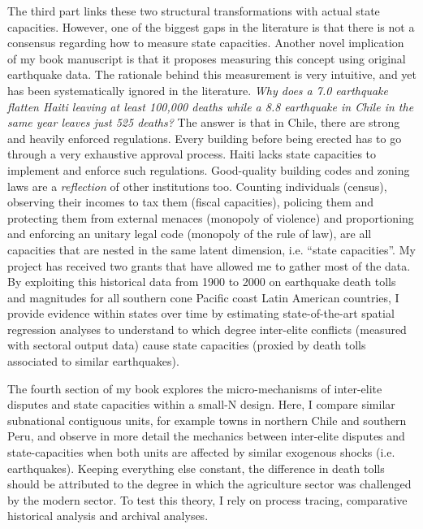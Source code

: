 \documentclass[11pt]{letter} %
\begin{document}
\begin{letter}{}
The third part links these two structural transformations with actual state capacities. However, one of the biggest gaps in the literature is that there is not a consensus regarding how to measure state capacities. Another novel implication of my book manuscript is that it proposes measuring this concept using original earthquake data. The rationale behind this measurement is very intuitive, and yet has been systematically ignored in the literature. \emph{Why does a 7.0 earthquake flatten Haiti leaving at least 100,000 deaths while a 8.8 earthquake in Chile in the same year leaves just 525 deaths?} The answer is that in Chile, there are strong and heavily enforced regulations. Every building before being erected has to go through a very exhaustive approval process. Haiti lacks state capacities to implement and enforce such regulations. Good-quality building codes and zoning laws are a \emph{reflection} of other institutions too. Counting individuals (census), observing their incomes to tax them (fiscal capacities), policing them and protecting them from external menaces (monopoly of violence) and proportioning and enforcing an unitary legal code (monopoly of the rule of law), are all capacities that are nested in the same latent dimension, i.e. ``state capacities''. My project has received two grants that have allowed me to gather most of the data. By exploiting this historical data from 1900 to 2000 on earthquake death tolls and magnitudes for all southern cone Pacific coast Latin American countries, I provide evidence within states over time by estimating state-of-the-art spatial regression analyses to understand to which degree inter-elite conflicts (measured with sectoral output data) cause state capacities (proxied by death tolls associated to similar earthquakes). 

The fourth section of my book explores the micro-mechanisms of inter-elite disputes and state capacities within a small-N design. Here, I compare similar subnational contiguous units, for example towns in northern Chile and southern Peru, and observe in more detail the mechanics between inter-elite disputes and state-capacities when both units are affected by similar exogenous shocks (i.e. earthquakes). Keeping everything else constant, the difference in death tolls should be attributed to the degree in which the agriculture sector was challenged by the modern sector. To test this theory, I rely on process tracing, comparative historical analysis and archival analyses. 


\end{letter}
\end{document}
